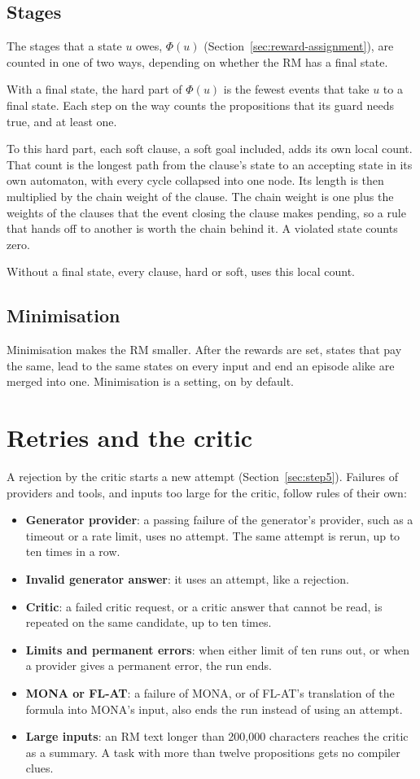 \documentclass[11pt,english,listoffigures,listoftables]{tfgetsinf}
\begin{document}
\subsection{Stages}
The stages that a state $u$ owes, $\Phi(u)$ (Section~\ref{sec:reward-assignment}), are counted in one of two ways, depending on whether the RM has a final state.

With a final state, the hard part of $\Phi(u)$ is the fewest events that take $u$ to a final state. Each step on the way counts the propositions that its guard needs true, and at least one.

To this hard part, each soft clause, a soft goal included, adds its own local count. That count is the longest path from the clause's state to an accepting state in its own automaton, with every cycle collapsed into one node. Its length is then multiplied by the chain weight of the clause. The chain weight is one plus the weights of the clauses that the event closing the clause makes pending, so a rule that hands off to another is worth the chain behind it. A violated state counts zero.

Without a final state, every clause, hard or soft, uses this local count.

\subsection{Minimisation}
Minimisation makes the RM smaller. After the rewards are set, states that pay the same, lead to the same states on every input and end an episode alike are merged into one. Minimisation is a setting, on by default.

\section{Retries and the critic}
A rejection by the critic starts a new attempt (Section~\ref{sec:step5}). Failures of providers and tools, and inputs too large for the critic, follow rules of their own:
\begin{itemize}
    \item \textbf{Generator provider}: a passing failure of the generator's provider, such as a timeout or a rate limit, uses no attempt. The same attempt is rerun, up to ten times in a row.
    \item \textbf{Invalid generator answer}: it uses an attempt, like a rejection.
    \item \textbf{Critic}: a failed critic request, or a critic answer that cannot be read, is repeated on the same candidate, up to ten times.
    \item \textbf{Limits and permanent errors}: when either limit of ten runs out, or when a provider gives a permanent error, the run ends.
    \item \textbf{MONA or FL-AT}: a failure of MONA, or of FL-AT's translation of the formula into MONA's input, also ends the run instead of using an attempt.
    \item \textbf{Large inputs}: an RM text longer than 200{,}000 characters reaches the critic as a summary. A task with more than twelve propositions gets no compiler clues.
\end{itemize}
\end{document}
